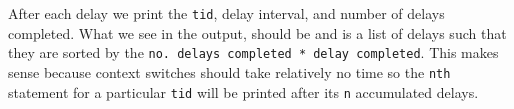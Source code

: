\documentclass[letterpaper]{article}
\begin{document}
After each delay we print the \verb!tid!, delay interval, and number of delays completed. What we see in the output, should be and is a list of delays such that they are sorted by the \verb!no. delays completed * delay completed!. This makes sense because context switches should take relatively no time so the \verb!nth! statement for a particular \verb!tid! will be printed after its \verb!n! accumulated delays.
\end{document}
